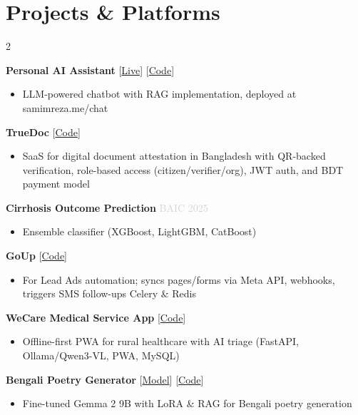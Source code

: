 \documentclass[letterpaper,11pt]{extarticle}
\begin{document}
\section{Projects \& Platforms}
\begin{multicols}{2}

\textbf{Personal AI Assistant} \hfill [\href{https://samimreza.me/chat}{Live}] [\href{https://github.com/samim-reza/MyChatBot}{Code}]
\begin{itemize}[noitemsep, topsep=0pt]
    \item LLM-powered chatbot with RAG implementation, deployed at samimreza.me/chat
\end{itemize}

\textbf{TrueDoc} \hfill [\href{https://github.com/samim-reza/TrueDoc}{Code}]
\begin{itemize}[noitemsep, topsep=0pt]
    \item SaaS for digital document attestation in Bangladesh with QR-backed verification, role-based access (citizen/verifier/org), JWT auth, and BDT payment model
\end{itemize}

\textbf{Cirrhosis Outcome Prediction} \hfill \textcolor{lightgray}{BAIC 2025}
\begin{itemize}[noitemsep, topsep=0pt]
    \item Ensemble classifier (XGBoost, LightGBM, CatBoost)
\end{itemize}

\columnbreak

\textbf{GoUp} \hfill [\href{https://github.com/samim-reza/GoUp}{Code}]
\begin{itemize}[noitemsep, topsep=0pt]
    \item For Lead Ads automation; syncs pages/forms via Meta API, webhooks, triggers SMS follow-ups Celery \& Redis
\end{itemize}

\textbf{WeCare Medical Service App} \hfill [\href{https://github.com/samim-reza/FutureBuilders2025_GreenU_Tensors}{Code}]
\begin{itemize}[noitemsep, topsep=0pt]
    \item Offline-first PWA for rural healthcare with AI triage (FastAPI, Ollama/Qwen3-VL, PWA, MySQL)
\end{itemize}

\textbf{Bengali Poetry Generator} \hfill [\href{https://huggingface.co/samim-reza/KobitaLM}{Model}] [\href{https://github.com/samim-reza/KobitaLM}{Code}]
\begin{itemize}[noitemsep, topsep=0pt]
    \item Fine-tuned Gemma 2 9B with LoRA \& RAG for Bengali poetry generation
\end{itemize}
\end{multicols}
\end{document}
